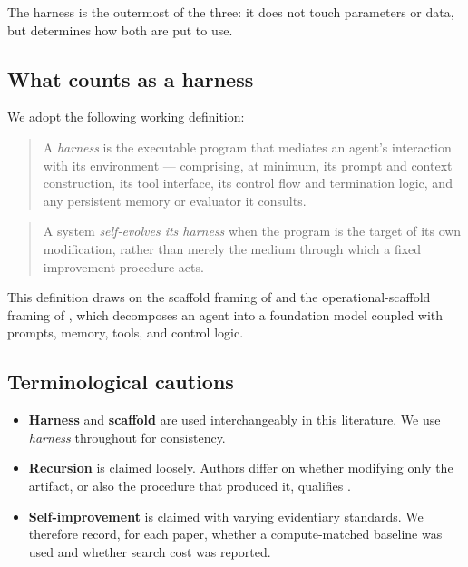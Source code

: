 The harness is the outermost of the three: it does not touch parameters or
data, but determines how both are put to use. 

\subsection{What counts as a harness}

We adopt the following working definition:

\begin{quote}
A \emph{harness} is the executable program that mediates an agent's
interaction with its environment --- comprising, at minimum, its prompt and
context construction, its tool interface, its control flow and termination
logic, and any persistent memory or evaluator it consults.
\end{quote}

\begin{quote}
A system \emph{self-evolves its harness} when the program is the target of its
own modification, rather than merely the medium through which a fixed
improvement procedure acts.
\end{quote}

This definition draws on the scaffold framing of \cite{zelikman2023stop} and
the operational-scaffold framing of \cite{ren2026selfimprovements}, which
decomposes an agent into a foundation model coupled with prompts, memory,
tools, and control logic.

\subsection{Terminological cautions}

\begin{itemize}
    \item \textbf{Harness} and \textbf{scaffold} are used interchangeably in
    this literature. We use \emph{harness} throughout for consistency.

    \item \textbf{Recursion} is claimed loosely. Authors differ on whether
    modifying only the artifact, or also the procedure that produced it,
    qualifies .

    \item \textbf{Self-improvement} is claimed with varying evidentiary
    standards. We therefore record, for each paper, whether a compute-matched
    baseline was used and whether search cost was reported.
\end{itemize}

